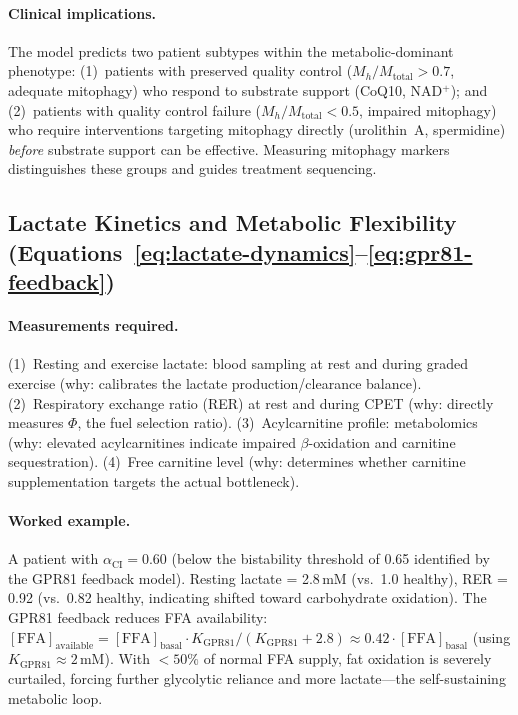 \paragraph{Clinical implications.}
The model predicts two patient subtypes within the metabolic-dominant phenotype: (1)~patients with preserved quality control ($M_h/M_{\text{total}} > 0.7$, adequate mitophagy) who respond to substrate support (CoQ10, NAD$^+$); and (2)~patients with quality control failure ($M_h/M_{\text{total}} < 0.5$, impaired mitophagy) who require interventions targeting mitophagy directly (urolithin~A, spermidine) \emph{before} substrate support can be effective. Measuring mitophagy markers distinguishes these groups and guides treatment sequencing.

\subsection{Lactate Kinetics and Metabolic Flexibility (Equations~\ref{eq:lactate-dynamics}--\ref{eq:gpr81-feedback})}

\paragraph{Measurements required.}
(1)~Resting and exercise lactate: blood sampling at rest and during graded exercise (why: calibrates the lactate production/clearance balance).
(2)~Respiratory exchange ratio (RER) at rest and during CPET (why: directly measures $\Phi$, the fuel selection ratio).
(3)~Acylcarnitine profile: metabolomics (why: elevated acylcarnitines indicate impaired $\beta$-oxidation and carnitine sequestration).
(4)~Free carnitine level (why: determines whether carnitine supplementation targets the actual bottleneck).

\paragraph{Worked example.}
A patient with $\alpha_{\text{CI}} = 0.60$ (below the bistability threshold of 0.65 identified by the GPR81 feedback model). Resting lactate = 2.8\,mM (vs.\ 1.0 healthy), RER = 0.92 (vs.\ 0.82 healthy, indicating shifted toward carbohydrate oxidation). The GPR81 feedback reduces FFA availability: $[\text{FFA}]_{\text{available}} = [\text{FFA}]_{\text{basal}} \cdot K_{\text{GPR81}}/(K_{\text{GPR81}} + 2.8) \approx 0.42 \cdot [\text{FFA}]_{\text{basal}}$ (using $K_{\text{GPR81}} \approx 2$\,mM). With $<50\%$ of normal FFA supply, fat oxidation is severely curtailed, forcing further glycolytic reliance and more lactate---the self-sustaining metabolic loop.

